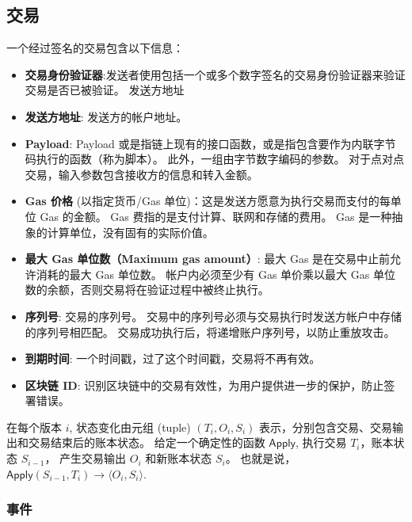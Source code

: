 \documentclass{article}
\begin{document}
\subsection{交易}

一个经过签名的交易包含以下信息：

\begin{itemize}
\item \textbf{交易身份验证器}:发送者使用包括一个或多个数字签名的交易身份验证器来验证交易是否已被验证。
发送方地址
\item \textbf{发送方地址}: 发送方的帐户地址。

\item \textbf{Payload}: Payload 或是指链上现有的接口函数，或是指包含要作为内联字节码执行的函数（称为脚本）。 此外，一组由字节数字编码的参数。 对于点对点交易，输入参数包含接收方的信息和转入金额。

\item \textbf{Gas 价格} (以指定货币/Gas 单位)：这是发送方愿意为执行交易而支付的每单位 Gas 的金额。 Gas 费指的是支付计算、联网和存储的费用。 Gas 是一种抽象的计算单位，没有固有的实际价值。

\item \textbf{最大 Gas 单位数（Maximum gas amount）}: 最大 Gas 是在交易中止前允许消耗的最大 Gas 单位数。 帐户内必须至少有 Gas 单价乘以最大 Gas 单位数的余额，否则交易将在验证过程中被终止执行。

\item \textbf{序列号}: 交易的序列号。 交易中的序列号必须与交易执行时发送方帐户中存储的序列号相匹配。 交易成功执行后，将递增账户序列号，以防止重放攻击。

\item \textbf{到期时间}: 一个时间戳，过了这个时间戳，交易将不再有效。

\item \textbf{区块链 ID}: 识别区块链中的交易有效性，为用户提供进一步的保护，防止签署错误。

\end{itemize}
在每个版本 $i$, 状态变化由元组 (tuple) $(T_i, O_i, S_i)$ 表示，分别包含交易、交易输出和交易结束后的账本状态。 给定一个确定性的函数 $\textsf{Apply}$, 执行交易 $T_i$，账本状态 $S_{i-1}$， 产生交易输出 $O_i$ 和新账本状态 $S_i$。 也就是说， $\textsf{Apply}(S_{i-1}, T_i) \rightarrow \langle O_i, S_i\rangle$. 

\subsubsection{事件}
\label{subsub:events}
\end{document}
